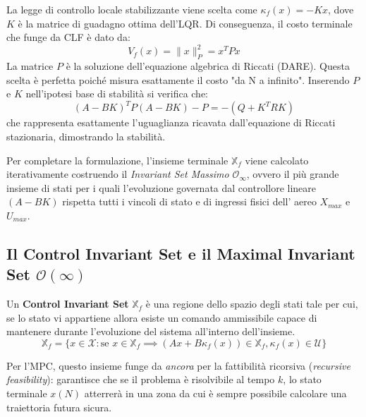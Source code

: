 La legge di controllo locale stabilizzante viene scelta come $\kappa_f(x) = -Kx$, dove $K$ è la matrice di guadagno ottima dell'LQR. Di conseguenza, il costo terminale che funge da CLF è dato da:
\begin{equation}
	V_f(x) = \|x\|_P^2 = x^T P x
\end{equation}
La matrice $P$ è la soluzione dell'equazione algebrica di Riccati (DARE). Questa scelta è perfetta poiché misura esattamente il costo "da N a infinito". Inserendo $P$ e $K$ nell'ipotesi base di stabilità si verifica che:
\begin{equation}
	(A-BK)^T P (A-BK) - P = -(Q + K^T R K)
\end{equation}
che rappresenta esattamente l'uguaglianza ricavata dall'equazione di Riccati stazionaria, dimostrando la stabilità.

Per completare la formulazione, l'insieme terminale $\mathbb{X}_f$ viene calcolato iterativamente costruendo il \textit{ Invariant Set Massimo} $\mathcal{O}_\infty$, ovvero il più grande insieme di stati per i quali l'evoluzione governata dal controllore lineare $(A-BK)$ rispetta tutti i vincoli di stato e di ingressi fisici dell' aereo  $X_{max}$ e $U_{max}$.
\subsection{Il Control Invariant Set e il Maximal Invariant Set $\mathcal{O}(\infty)$}
Un \textbf{Control Invariant Set} $\mathbb{X}_f$ è una regione dello spazio degli stati tale per cui, se lo stato vi appartiene allora esiste un comando ammissibile capace di mantenere durante l'evoluzione del sistema all'interno dell'insieme. 
\begin{equation}
	\mathbb{X}_f = \{x \in \mathcal{X} : \text{se } x \in \mathbb{X}_f \implies (Ax + B\kappa_f(x)) \in \mathbb{X}_f, \kappa_f(x) \in \mathcal{U}\}
\end{equation}

Per l'MPC, questo insieme funge da \textit{ancora} per la fattibilità ricorsiva (\textit{recursive feasibility}): garantisce che se il problema è risolvibile al tempo $k$, lo stato terminale $x(N)$ atterrerà in una zona da cui è sempre possibile calcolare una traiettoria futura sicura.

